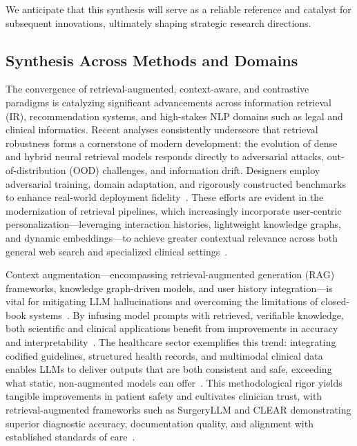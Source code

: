 \documentclass[sigconf]{acmart}
\begin{document}
We anticipate that this synthesis will serve as a reliable reference and catalyst for subsequent innovations, ultimately shaping strategic research directions.

\subsection{Synthesis Across Methods and Domains}

The convergence of retrieval-augmented, context-aware, and contrastive paradigms is catalyzing significant advancements across information retrieval (IR), recommendation systems, and high-stakes NLP domains such as legal and clinical informatics. Recent analyses consistently underscore that retrieval robustness forms a cornerstone of modern development: the evolution of dense and hybrid neural retrieval models responds directly to adversarial attacks, out-of-distribution (OOD) challenges, and information drift. Designers employ adversarial training, domain adaptation, and rigorously constructed benchmarks to enhance real-world deployment fidelity~\cite{ref4,ref5}. These efforts are evident in the modernization of retrieval pipelines, which increasingly incorporate user-centric personalization—leveraging interaction histories, lightweight knowledge graphs, and dynamic embeddings—to achieve greater contextual relevance across both general web search and specialized clinical settings~\cite{ref24,ref25,ref49}.

Context augmentation—encompassing retrieval-augmented generation (RAG) frameworks, knowledge graph-driven models, and user history integration—is vital for mitigating LLM hallucinations and overcoming the limitations of closed-book systems~\cite{ref1,ref10}. By infusing model prompts with retrieved, verifiable knowledge, both scientific and clinical applications benefit from improvements in accuracy and interpretability~\cite{ref7,ref11}. The healthcare sector exemplifies this trend: integrating codified guidelines, structured health records, and multimodal clinical data enables LLMs to deliver outputs that are both consistent and safe, exceeding what static, non-augmented models can offer~\cite{ref6,ref14,ref17}. This methodological rigor yields tangible improvements in patient safety and cultivates clinician trust, with retrieval-augmented frameworks such as SurgeryLLM and CLEAR demonstrating superior diagnostic accuracy, documentation quality, and alignment with established standards of care~\cite{ref1,ref3,ref6}.
\end{document}

